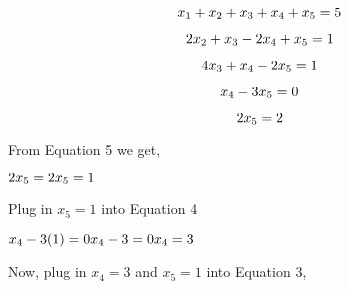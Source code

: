 \documentclass{article}
\begin{document}
    \begin{equation} %
        \raggedright x_1 + x_2 + x_3 + x_4 + x_5 = 5
    \end{equation}

    \begin{equation} %
        \raggedright 2x_2 + x_3 - 2x_4 + x_5 = 1
    \end{equation}

    \begin{equation} %
        \raggedright 4x_3 + x_4 - 2x_5 = 1 
    \end{equation}

    \begin{equation} %
        \raggedright x_4 - 3x_5 = 0 
    \end{equation}

    \begin{equation} %
        \raggedright 2x_5 = 2 
    \end{equation}

\raggedright From Equation 5 we get, \newline

    \begin{math}
         2x_5 = 2 
         \newline %
         x_5 = 1 
         \newline
    \end{math} \newline

\raggedright Plug in \begin{math} x_5 = 1 \end{math} into Equation 4 \newline

    \begin{math}
         x_4 - 3(1) = 0  
         \newline 
         x_4 - 3 = 0
         \newline
         x_4 = 3
    \end{math} \newline

\raggedright Now, plug in \begin{math} x_4 = 3 \end{math} and \begin{math} x_5 = 1 \end{math}  into Equation 3, \newline
    
\end{document}
